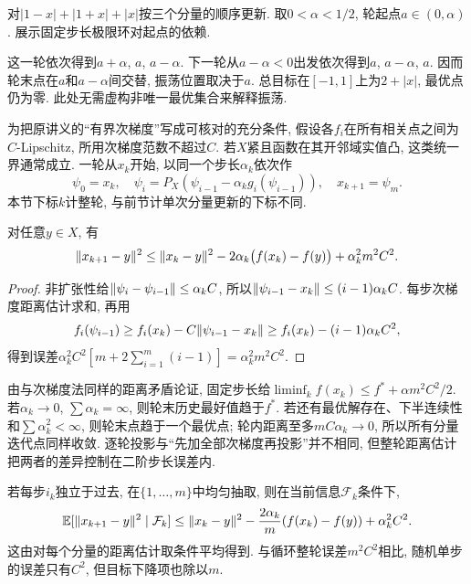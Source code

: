 \begin{example}
对$|1-x|+|1+x|+|x|$按三个分量的顺序更新. 取$0<\alpha<1/2$, 轮起点$a\in(0,\alpha)$. 展示固定步长极限环对起点的依赖.
\end{example}
\begin{solution}
这一轮依次得到$a+\alpha$, $a$, $a-\alpha$. 下一轮从$a-\alpha<0$出发依次得到$a$, $a-\alpha$, $a$. 因而轮末点在$a$和$a-\alpha$间交替, 振荡位置取决于$a$. 总目标在$[-1,1]$上为$2+|x|$, 最优点仍为零. 此处无需虚构非唯一最优集合来解释振荡.
\end{solution}

为把原讲义的“有界次梯度”写成可核对的充分条件, 假设各$f_i$在所有相关点之间为$C$-Lipschitz, 所用次梯度范数不超过$C$. 若$X$紧且函数在其开邻域实值凸, 这类统一界通常成立. 一轮从$x_k$开始, 以同一个步长$\alpha_k$依次作
\[
 \psi_0=x_k,\quad \psi_i=P_X(\psi_{i-1}-\alpha_k g_i(\psi_{i-1})),\quad
 x_{k+1}=\psi_m.
\]
本节下标$k$计整轮, 与前节计单次分量更新的下标不同.

\begin{lemma}\label{lem:incremental-cycle}
对任意$y\in X$, 有
\[
 \lVert x_{k+1}-y\rVert^2\le\lVert x_k-y\rVert^2
 -2\alpha_k\bigl(f(x_k)-f(y)\bigr)+\alpha_k^2m^2C^2.
\]
\end{lemma}
\begin{proof}
非扩张性给$\lVert \psi_i-\psi_{i-1}\rVert\le\alpha_k C$, 所以$\lVert \psi_{i-1}-x_k\rVert\le(i-1)\alpha_k C$. 每步次梯度距离估计求和, 再用
\[
 f_i(\psi_{i-1})\ge f_i(x_k)-C\lVert \psi_{i-1}-x_k\rVert
 \ge f_i(x_k)-(i-1)\alpha_kC^2,
\]
得到误差$\alpha_k^2 C^2[m+2\sum_{i=1}^m(i-1)]=\alpha_k^2m^2C^2$.
\end{proof}

由与次梯度法同样的距离矛盾论证, 固定步长给$\liminf_k f(x_k)\le f^*+\alpha m^2C^2/2$. 若$\alpha_k\to0$, $\sum\alpha_k=\infty$, 则轮末历史最好值趋于$f^*$. 若还有最优解存在、下半连续性和$\sum\alpha_k^2<\infty$, 则轮末点趋于一个最优点; 轮内距离至多$mC\alpha_k\to0$, 所以所有分量迭代点同样收敛. 逐轮投影与“先加全部次梯度再投影”并不相同, 但整轮距离估计把两者的差异控制在二阶步长误差内.

若每步$i_k$独立于过去, 在$\{1,\ldots,m\}$中均匀抽取, 则在当前信息$\mathcal F_k$条件下,
\begin{equation}\label{eq:random-incremental-distance}
 \mathbb E[\lVert x_{k+1}-y\rVert^2\mid\mathcal F_k]
 \le\lVert x_k-y\rVert^2-\frac{2\alpha_k}{m}(f(x_k)-f(y))+\alpha_k^2C^2.
\end{equation}
这由对每个分量的距离估计取条件平均得到. 与循环整轮误差$m^2C^2$相比, 随机单步的误差只有$C^2$, 但目标下降项也除以$m$.

